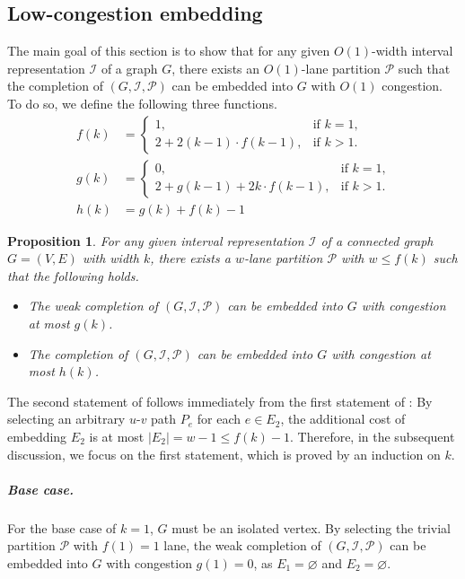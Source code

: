 \documentclass[11pt]{article}
\newtheorem{proposition}[lemma]{Proposition}
\theoremstyle{definition}
\theoremstyle{remark}
\renewcommand{\emptyset}{\varnothing}
\begin{document}
\subsection{Low-congestion embedding}\label{sect:embedding}
The main goal of this section is to show that for any given $O(1)$-width interval representation $\mathcal{I}$ of a graph $G$, there exists an $O(1)$-lane partition $\mathcal{P}$ such that the completion of $(G,\mathcal{I},\mathcal{P})$ can be embedded into $G$ with $O(1)$ congestion. To do so, we define the following three functions.
\begin{align*}
   f(k) &=\begin{cases}
    1, &\text{if $k=1$,}\\
    2 + 2(k-1) \cdot f(k-1), &\text{if $k > 1$.}
\end{cases}\\
   g(k) &=\begin{cases}
    0, &\text{if $k=1$,}\\
    2 + g(k-1) + 2k \cdot f(k-1), &\text{if $k > 1$.}
\end{cases}\\
h(k) &= g(k)+f(k)-1
\end{align*}

 

\begin{proposition}
\label{low-completion-cost}
For any given interval representation $\mathcal{I}$ of a connected graph $G=(V,E)$ with width $k$, there exists a $w$-lane partition $\mathcal{P}$ with $w \leq f(k)$ such that the following holds.
\begin{itemize}
    \item The weak completion of $(G,\mathcal{I},\mathcal{P})$ can be embedded into $G$ with congestion at most $g(k)$.
    \item The completion of $(G,\mathcal{I},\mathcal{P})$ can be embedded into $G$ with congestion at most $h(k)$.
\end{itemize}
\end{proposition}

The second statement of  follows immediately from the first statement of : By selecting an arbitrary $u$-$v$ path $P_e$ for each $e \in E_2$, the additional cost of embedding $E_2$ is at most $|E_2| = w-1 \leq f(k)-1$. Therefore, in the subsequent discussion, we focus on the first statement, which is proved by an induction on $k$. 


\subparagraph{Base case.} For the base case of $k = 1$, $G$ must be an isolated vertex. By selecting the trivial partition $\mathcal{P}$ with $f(1) = 1$ lane, the weak completion of $(G,\mathcal{I},\mathcal{P})$ can be embedded into $G$ with congestion $g(1) = 0$, as $E_1 = \emptyset$ and $E_2 = \emptyset$.
\end{document}
